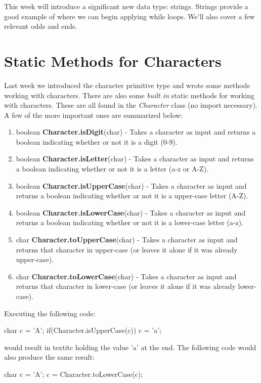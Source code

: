 This week will introduce a significant new data type: strings. Strings provide a good example of where we can begin applying while loops. We'll also cover a few relevant odds and ends. 

\section{Static Methods for Characters}

Last week we introduced the character primitive type and wrote some methods working with characters. There are also some \textit{built in} static methods for working with characters. These are all found in the \textit{Character} class (no import necessary). A few of the more important ones are summarized below:

\begin{enumerate}
\item boolean \textbf{Character.isDigit}(char) - Takes a character as input and returns a boolean indicating whether or not it is a digit (0-9). 
\item boolean \textbf{Character.isLetter}(char) - Takes a character as input and returns a boolean indicating whether or not it is a letter (a-z or A-Z). 
\item boolean \textbf{Character.isUpperCase}(char) - Takes a character as input and returns a boolean indicating whether or not it is a upper-case letter (A-Z). 
\item boolean \textbf{Character.isLowerCase}(char) - Takes a character as input and returns a boolean indicating whether or not it is a lower-case letter (a-z).
\item char \textbf{Character.toUpperCase}(char) - Takes a character as input and returns that character in upper-case (or leaves it alone if it was already upper-case).
\item char \textbf{Character.toLowerCase}(char) - Takes a character as input and returns that character in lower-case (or leaves it alone if it was already lower-case).
\end{enumerate}

\begin{exa}
Executing the following code:

\begin{code}
char c = 'A';
if(Character.isUpperCase(c)) {
  c = 'a';
}
\end{code}

would result in textit{c} holding the value 'a' at the end.  The following code would also produce the same result:


\begin{code}
char c = 'A';
c = Character.toLowerCase(c);
\end{code}
\end{exa}


